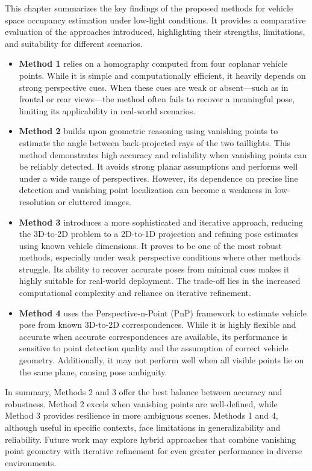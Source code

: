This chapter summarizes the key findings of the proposed methods for vehicle space occupancy estimation under low-light conditions. It provides a comparative evaluation of the approaches introduced, highlighting their strengths, limitations, and suitability for different scenarios.
\begin{itemize}
    \item \textbf{Method 1} relies on a homography computed from four coplanar vehicle points. While it is simple and computationally efficient, it heavily depends on strong perspective cues. When these cues are weak or absent—such as in frontal or rear views—the method often fails to recover a meaningful pose, limiting its applicability in real-world scenarios.
    \item \textbf{Method 2} builds upon geometric reasoning using vanishing points to estimate the angle between back-projected rays of the two taillights. This method demonstrates high accuracy and reliability when vanishing points can be reliably detected. It avoids strong planar assumptions and performs well under a wide range of perspectives. However, its dependence on precise line detection and vanishing point localization can become a weakness in low-resolution or cluttered images.
    \item \textbf{Method 3} introduces a more sophisticated and iterative approach, reducing the 3D-to-2D problem to a 2D-to-1D projection and refining pose estimates using known vehicle dimensions. It proves to be one of the most robust methods, especially under weak perspective conditions where other methods struggle. Its ability to recover accurate poses from minimal cues makes it highly suitable for real-world deployment. The trade-off lies in the increased computational complexity and reliance on iterative refinement.
    \item \textbf{Method 4} uses the Perspective-n-Point (PnP) framework to estimate vehicle pose from known 3D-to-2D correspondences. While it is highly flexible and accurate when accurate correspondences are available, its performance is sensitive to point detection quality and the assumption of correct vehicle geometry. Additionally, it may not perform well when all visible points lie on the same plane, causing pose ambiguity.
\end{itemize}

In summary, Methods 2 and 3 offer the best balance between accuracy and robustness. Method 2 excels when vanishing points are well-defined, while Method 3 provides resilience in more ambiguous scenes. Methods 1 and 4, although useful in specific contexts, face limitations in generalizability and reliability. Future work may explore hybrid approaches that combine vanishing point geometry with iterative refinement for even greater performance in diverse environments.

